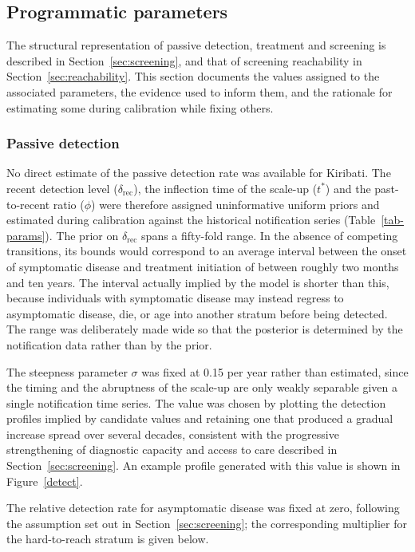 \subsection{Programmatic parameters}

The structural representation of passive detection, treatment and screening is described in Section~\ref{sec:screening}, and that of screening reachability in Section~\ref{sec:reachability}. This section documents the values assigned to the associated parameters, the evidence used to inform them, and the rationale for estimating some during calibration while fixing others.   

\subsubsection{Passive detection}

No direct estimate of the passive detection rate was available for Kiribati. The recent detection level (\(\delta_{\mathrm{rec}}\)), the inflection time of the scale-up (\(t^\ast\)) and the past-to-recent ratio (\(\phi\)) were therefore assigned uninformative uniform priors and estimated during calibration against the historical notification series (Table~\ref{tab-params}). The prior on \(\delta_{\mathrm{rec}}\) spans a fifty-fold range. In the absence of competing transitions, its bounds would correspond to an average interval between the onset of symptomatic disease and treatment initiation of between roughly two months and ten years. The interval actually implied by the model is shorter than this, because individuals with symptomatic disease may instead regress to asymptomatic disease, die, or age into another stratum before being detected. The range was deliberately made wide so that the posterior is determined by the notification data rather than by the prior.

The steepness parameter \(\sigma\) was fixed at 0.15 per year rather than estimated, since the timing and the abruptness of the scale-up are only weakly separable given a single notification time series. The value was chosen by plotting the detection profiles implied by candidate values and retaining one that produced a gradual increase spread over several decades, consistent with the progressive strengthening of diagnostic capacity and access to care described in Section~\ref{sec:screening}. An example profile generated with this value is shown in Figure~\ref{detect}.

The relative detection rate for asymptomatic disease was fixed at zero, following the assumption set out in Section~\ref{sec:screening}; the corresponding multiplier for the hard-to-reach stratum is given below.


